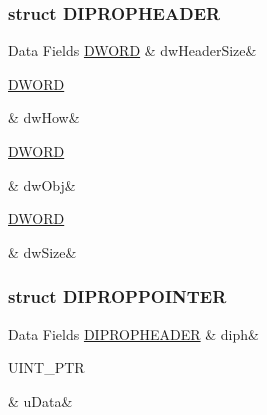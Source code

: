\subsubsection{struct D\-I\-P\-R\-O\-P\-H\-E\-A\-D\-E\-R}
\begin{DoxyFields}{Data Fields}
\hypertarget{a00003_a36e908f5e7f0a92e278f162a45b88eae}{\hyperlink{a00003_a50e15ae51c87ae06ab29c8148cb5f36c}{D\-W\-O\-R\-D}}\label{a00003_a36e908f5e7f0a92e278f162a45b88eae}
&
dw\-Header\-Size&
\\
\hline

\hypertarget{a00003_a4b57c3b37d55d8ad2406fe985df8ffa5}{\hyperlink{a00003_a50e15ae51c87ae06ab29c8148cb5f36c}{D\-W\-O\-R\-D}}\label{a00003_a4b57c3b37d55d8ad2406fe985df8ffa5}
&
dw\-How&
\\
\hline

\hypertarget{a00003_ae55671f00fe7c7a5fbe72c05761f58d0}{\hyperlink{a00003_a50e15ae51c87ae06ab29c8148cb5f36c}{D\-W\-O\-R\-D}}\label{a00003_ae55671f00fe7c7a5fbe72c05761f58d0}
&
dw\-Obj&
\\
\hline

\hypertarget{a00003_a669c5a85f5a9eb97e64ad880fadaaa2d}{\hyperlink{a00003_a50e15ae51c87ae06ab29c8148cb5f36c}{D\-W\-O\-R\-D}}\label{a00003_a669c5a85f5a9eb97e64ad880fadaaa2d}
&
dw\-Size&
\\
\hline

\end{DoxyFields}
\label{d4/d3a/a00101}
\hypertarget{a00003_d4/d3a/a00101}{}
\subsubsection{struct D\-I\-P\-R\-O\-P\-P\-O\-I\-N\-T\-E\-R}
\begin{DoxyFields}{Data Fields}
\hypertarget{a00003_a7010842dfbdaa5bb4357503558202537}{\hyperlink{a00003_d0/d61/a00100}{D\-I\-P\-R\-O\-P\-H\-E\-A\-D\-E\-R}}\label{a00003_a7010842dfbdaa5bb4357503558202537}
&
diph&
\\
\hline

\hypertarget{a00003_ab3c0940c60b9041e59f7b6e8d4609542}{U\-I\-N\-T\-\_\-\-P\-T\-R}\label{a00003_ab3c0940c60b9041e59f7b6e8d4609542}
&
u\-Data&
\\
\hline

\end{DoxyFields}
\label{d9/dcc/a00102}
\hypertarget{a00003_d9/dcc/a00102}{}
